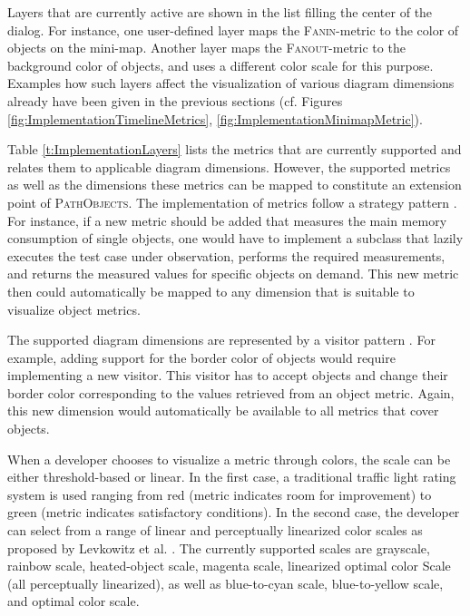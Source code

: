Layers that are currently active are shown in the list filling the center of the dialog.
For instance, one user-defined layer maps the \textsc{Fanin}-metric to the color of objects on the mini-map.
Another layer maps the \textsc{Fanout}-metric to the background color of objects, and uses a different color scale for this purpose.
Examples how such layers affect the visualization of various diagram dimensions already have been given in the previous sections (cf. Figures \ref{fig:ImplementationTimelineMetrics}, \ref{fig:ImplementationMinimapMetric}).

Table \ref{t:ImplementationLayers} lists the metrics that are currently supported and relates them to applicable diagram dimensions.
However, the supported metrics as well as the dimensions these metrics can be mapped to constitute an extension point of \textsc{PathObjects}.
The implementation of metrics follow a strategy pattern \cite{gamma_design_1995}.
For instance, if a new metric should be added that measures the main memory consumption of single objects, one would have to implement a subclass that lazily executes the test case under observation, performs the required measurements, and returns the measured values for specific objects on demand.
This new metric then could automatically be mapped to any dimension that is suitable to visualize object metrics.

The supported diagram dimensions are represented by a visitor pattern \cite{gamma_design_1995}.
For example, adding support for the border color of objects would require implementing a new visitor.
This visitor has to accept objects and change their border color corresponding to the values retrieved from an object metric.
Again, this new dimension would automatically be available to all metrics that cover objects.

When a developer chooses to visualize a metric through colors, the scale can be either threshold-based or linear.
In the first case, a traditional traffic light rating system is used ranging from red (metric indicates room for improvement) to green (metric indicates satisfactory conditions).
In the second case, the developer can select from a range of linear and perceptually linearized color scales as proposed by Levkowitz et al. \cite{levkowitz_color_1992, levkowitz_color_1997}.
The currently supported scales are grayscale, rainbow scale, heated-object scale, magenta scale, linearized optimal color Scale (all perceptually linearized), as well as blue-to-cyan scale, blue-to-yellow scale, and optimal color scale.